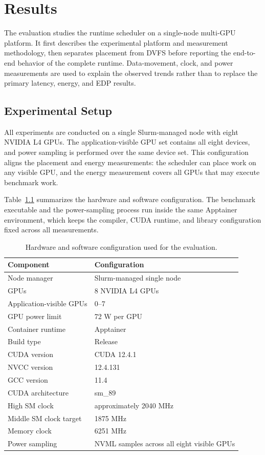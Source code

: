 \chapter{Results}
\label{chap:results}


The evaluation studies the \CUDASTF{} runtime scheduler on a single-node
multi-GPU platform. It first describes the experimental platform and
measurement methodology, then separates placement from DVFS before reporting
the end-to-end behavior of the complete runtime. Data-movement, clock, and
power measurements are used to explain the observed trends rather than to
replace the primary latency, energy, and EDP results.

\section{Experimental Setup}
\label{sec:results-setup}

All experiments are conducted on a single Slurm-managed node with eight NVIDIA
L4 GPUs. The application-visible GPU set contains all eight devices, and power
sampling is performed over the same device set. This configuration aligns the
placement and energy measurements: the scheduler can place work on any visible
GPU, and the energy measurement covers all GPUs that may execute benchmark
work.

Table~\ref{tab:results-platform} summarizes the hardware and software
configuration. The benchmark executable and the power-sampling process run
inside the same Apptainer environment, which keeps the compiler, CUDA runtime,
and library configuration fixed across all measurements.

\begin{table}[!htbp]
\centering
\footnotesize
\begin{tabular}{@{}ll@{}}
\toprule
Component & Configuration \\
\midrule
Node manager & Slurm-managed single node \\
GPUs & 8 NVIDIA L4 GPUs \\
Application-visible GPUs & 0--7 \\
GPU power limit & 72 W per GPU \\
Container runtime & Apptainer \\
Build type & Release \\
CUDA version & CUDA 12.4.1 \\
NVCC version & 12.4.131 \\
GCC version & 11.4 \\
CUDA architecture & sm\_89 \\
High SM clock & approximately 2040 MHz \\
Middle SM clock target & 1875 MHz \\
Memory clock & 6251 MHz \\
Power sampling & NVML samples across all eight visible GPUs \\
\bottomrule
\end{tabular}
\caption{Hardware and software configuration used for the evaluation.}
\label{tab:results-platform}
\end{table}

